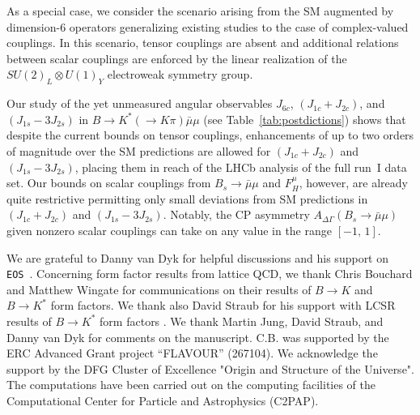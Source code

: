 \documentclass[twocolumn,epjc3]{svjour3}
\numberwithin{equation}{section}
\def \reftab#1{Table~\ref{#1}}
\renewcommand{\[}{\big[}
\renewcommand{\]}{\big]}
\renewcommand{\(}{\big(}
\renewcommand{\)}{\big)}
\def \eos{\texttt{EOS}}
\begin{document}
As a special case, we consider the scenario arising from the SM
augmented by dimension-6 operators generalizing existing studies to
the case of complex-valued couplings. In this scenario, tensor
couplings are absent and additional relations between scalar couplings
are enforced by the linear realization of the $SU(2)_L \otimes U(1)_Y$
electroweak symmetry group.

Our study of the {yet unmeasured} angular observables $J_{6c}$,
$(J_{1c} + J_{2c})$, and $(J_{1s} - 3 J_{2s})$ in $B\to K^* (\to K\pi)
\bar\mu\mu$ (see \reftab{tab:postdictions}) shows that despite the
current bounds on tensor couplings, enhancements of up to two orders
of magnitude over the SM predictions are allowed for $(J_{1c} +
J_{2c})$ and $(J_{1s} - 3 J_{2s})$, placing them in reach of the LHCb
analysis of the full run~I data set. Our bounds on scalar couplings
from $B_s\to \bar\mu\mu$ and $F_H^\mu$, however, are already quite
restrictive permitting only small deviations from SM predictions in
$(J_{1c} + J_{2c})$ and $(J_{1s} - 3 J_{2s})$. Notably, the CP
asymmetry $A_{\Delta\Gamma}(B_s\to \bar\mu\mu)$ given nonzero scalar
couplings can take on any value in the range $[-1,\, 1]$.

%
%
%
\begin{acknowledgements}
  We are grateful to Danny van Dyk for helpful discussions and his support on
  \eos~\cite{EOS}. Concerning form factor results from lattice QCD, we thank
  Chris Bouchard and Matthew Wingate for communications on their results of
  $B\to K$ \cite{Bouchard:2013eph} and $B\to K^*$ \cite{Horgan:2015vla} form
  factors. We thank also David Straub for his support with LCSR results of $B\to
  K^*$ form factors \cite{Straub:2015ica}. We thank Martin Jung, David Straub,
  and Danny van Dyk for comments on the manuscript. C.B. was supported by the ERC
  Advanced Grant project ``FLAVOUR'' (267104). We acknowledge the support by the
  DFG Cluster of Excellence "Origin and Structure of the Universe". The
  computations have been carried out on the computing facilities of the
  Computational Center for Particle and Astrophysics (C2PAP).
\end{acknowledgements}


%
%

\appendix
\end{document}
